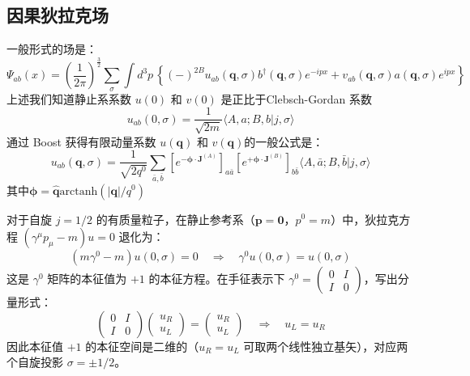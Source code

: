 \subsection{因果狄拉克场 }
一般形式的场是：
\begin{equation}
    \Psi_{ab}(x) =(\frac{1}{2\pi})^\frac{3}{2}\sum_{\sigma}\int d^3p \, \left\{(-)^{2B} u_{ab}(\boldsymbol{q},\sigma)b^\dagger(\boldsymbol{q},\sigma) e^{-ipx} + v_{ab}(\boldsymbol{q},\sigma) a(\boldsymbol{q},\sigma)e^{ipx} \right\}
\end{equation}
上述我们知道静止系系数 $u(0)$ 和 $v(0)$ 是正比于Clebsch-Gordan  系数 
\begin{equation}
    u_{ab}(0, \sigma) = \frac{1}{\sqrt{2m}} \langle A, a; B, b | j, \sigma \rangle
    \label{eq:u0_general_1/2}
\end{equation}
通过 Boost 获得有限动量系数 $u(\boldsymbol{q})$ 和 $v(\boldsymbol{q})$的一般公式是：
\begin{equation}
    u_{ab}(\boldsymbol{q}, \sigma) = \frac{1}{\sqrt{2q^0}} \sum_{\bar{a},\bar{b}} \left[e^{-\boldsymbol{\phi}\cdot\mathbf{J}^{(A)}}\right]_{a\bar{a}} \left[e^{+\boldsymbol{\phi}\cdot\mathbf{J}^{(B)}}\right]_{b\bar{b}} \langle A,\bar{a}; B,\bar{b} | j, \sigma \rangle
    \label{eq:u_finite_general_1/2}
\end{equation}
其中$\boldsymbol{\phi} = \hat{\boldsymbol{q}} \text{arctanh}(|\boldsymbol{q}|/q^0)$
\vspace{0.5cm}
\begin{center}
    \large{}
\end{center}
\vspace{0.5cm}
对于自旋 $j=1/2$ 的有质量粒子，在静止参考系（$\boldsymbol{p}=\mathbf{0}$，$p^0=m$）中，狄拉克方程 $(\gamma^\mu p_\mu - m)u=0$ 退化为：
\begin{equation}
    (m\gamma^0 - m)u(0,\sigma) = 0 \quad\Longrightarrow\quad \gamma^0 u(0,\sigma) = u(0,\sigma)
\end{equation}
这是 $\gamma^0$ 矩阵的本征值为 $+1$ 的本征方程。在手征表示下 $\gamma^0 = \begin{pmatrix} 0&I\\I&0 \end{pmatrix}$，写出分量形式：
\begin{equation}
    \begin{pmatrix} 0&I\\I&0 \end{pmatrix}\begin{pmatrix} u_R \\ u_L \end{pmatrix} = \begin{pmatrix} u_R \\ u_L \end{pmatrix} \quad\Longrightarrow\quad u_L = u_R
\end{equation}
因此本征值 $+1$ 的本征空间是二维的（$u_R = u_L$ 可取两个线性独立基矢），对应两个自旋投影 $\sigma = \pm 1/2$。

